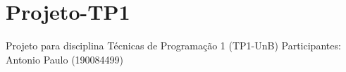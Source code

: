 \chapter{Projeto-\/\+TP1}
\hypertarget{md__r_e_a_d_m_e}{}\label{md__r_e_a_d_m_e}
\label{md__r_e_a_d_m_e_autotoc_md0}%
%
Projeto para disciplina Técnicas de Programação 1 (TP1-\/\+UnB) Participantes\+: Antonio Paulo (190084499) 